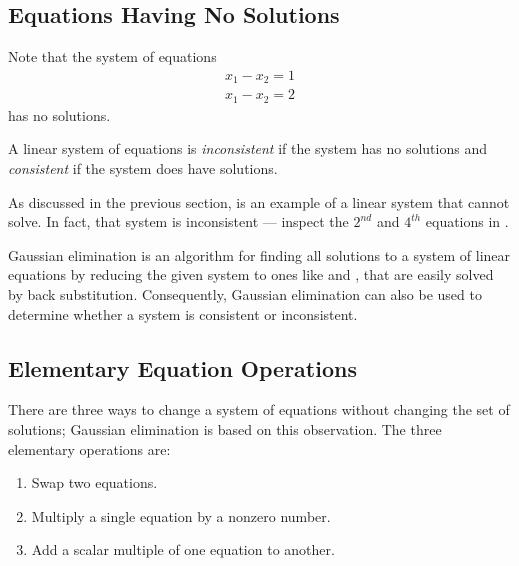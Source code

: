 \subsection*{Equations Having No Solutions}

Note that the system of equations
\begin{eqnarray*}
x_1 - x_2 = 1\\
x_1 - x_2 = 2
\end{eqnarray*}
has no solutions.

\begin{Def}
A linear system of equations is {\em inconsistent\/} if the
system has no solutions and {\em consistent\/} if the system
does have solutions.
\end{Def}  

As discussed in the previous section,  is an example
of a linear system that \Matlab cannot solve.  In fact, that
system is inconsistent --- inspect the $2^{nd}$ and $4^{th}$
equations in .

Gaussian elimination is an algorithm for finding all solutions
to a system of linear equations by reducing the given system to
ones like  and , that are easily solved by
back substitution.  Consequently, Gaussian elimination can also be
used to determine whether a system is consistent or inconsistent.

\subsection*{Elementary Equation Operations}

There are three ways to change a system of equations without
changing the set of solutions; Gaussian elimination
 is based on this observation.  The
three elementary operations are:
\begin{enumerate}
\item   Swap two equations.
\item   Multiply a single equation by a nonzero number.
\item   Add a scalar multiple of one equation to another.
\end{enumerate}

